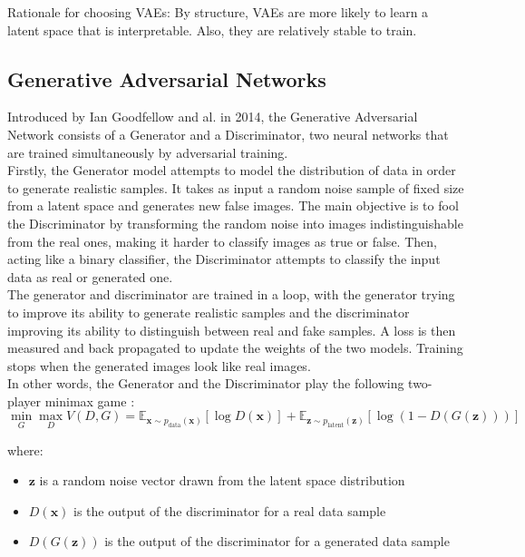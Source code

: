 \documentclass{article}
\begin{document}
Rationale for choosing VAEs: By structure, VAEs are more likely to learn a latent space that is interpretable. Also, they are relatively stable to train.

\subsection{Generative Adversarial Networks}

\quad Introduced by Ian Goodfellow and al. in 2014, the Generative Adversarial Network consists of a Generator and a Discriminator, two neural networks that are trained simultaneously by adversarial training. \\
Firstly, the Generator model attempts to model the distribution of data in order to generate realistic samples. 
It takes as input a random noise sample of fixed size from a latent space and generates new false images. 
The main objective is to fool the Discriminator by transforming the random noise into images indistinguishable from the real ones, making it harder to classify images as true or false. 
Then, acting like a binary classifier, the Discriminator attempts to classify the input data as real or generated one. \\

The generator and discriminator are trained in a loop, with the generator trying to improve its ability to generate realistic samples and the discriminator improving its ability to distinguish between real and fake samples. 
A loss is then measured and back propagated to update the weights of the two models. 
Training stops when the generated images look like real images.\\
In other words, the Generator and the Discriminator play the following two-player minimax game :
$$ \min_G \max_D V(D, G) = \mathbb{E}_{\mathbf{x} \sim p_{\text{data}}(\mathbf{x})} [\log D(\mathbf{x})] + \mathbb{E}_{\mathbf{z} \sim p_{\text{latent}}(\mathbf{z})} [\log (1 - D(G(\mathbf{z})))] $$

where:

\begin{itemize}
    \item $\mathbf{z}$ is a random noise vector drawn from the latent space distribution 
    \item $D(\mathbf{x})$ is the output of the discriminator for a real data sample
    \item $D(G(\mathbf{z}))$ is the output of the discriminator for a generated data sample
\end{itemize}
\end{document}
